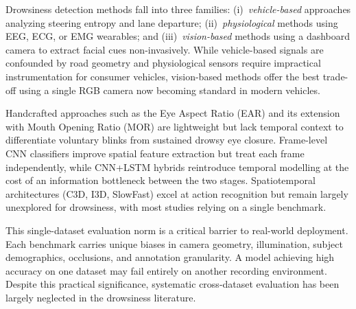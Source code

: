 \documentclass[journal]{IEEEtran}
\begin{document}
Drowsiness detection methods fall into three families: (i)~\textit{vehicle-based} approaches analyzing steering entropy and lane departure\cite{sahayadhas2012}; (ii)~\textit{physiological} methods using EEG, ECG, or EMG wearables\cite{kaida2006}; and (iii)~\textit{vision-based} methods using a dashboard camera to extract facial cues non-invasively. While vehicle-based signals are confounded by road geometry and physiological sensors require impractical instrumentation for consumer vehicles, vision-based methods offer the best trade-off using a single RGB camera now becoming standard in modern vehicles.

Handcrafted approaches such as the Eye Aspect Ratio (EAR)\cite{soukupova2016} and its extension with Mouth Opening Ratio (MOR)\cite{raza2021} are lightweight but lack temporal context to differentiate voluntary blinks from sustained drowsy eye closure. Frame-level CNN classifiers\cite{weng2016} improve spatial feature extraction but treat each frame independently, while CNN+LSTM hybrids\cite{massoz2018} reintroduce temporal modelling at the cost of an information bottleneck between the two stages. Spatiotemporal architectures (C3D\cite{tran2015}, I3D\cite{carreira2017}, SlowFast\cite{feichtenhofer2019}) excel at action recognition but remain largely unexplored for drowsiness, with most studies relying on a single benchmark.

This single-dataset evaluation norm is a critical barrier to real-world deployment. Each benchmark carries unique biases in camera geometry, illumination, subject demographics, occlusions, and annotation granularity. A model achieving high accuracy on one dataset may fail entirely on another recording environment. Despite this practical significance, systematic cross-dataset evaluation has been largely neglected in the drowsiness literature.
\end{document}
